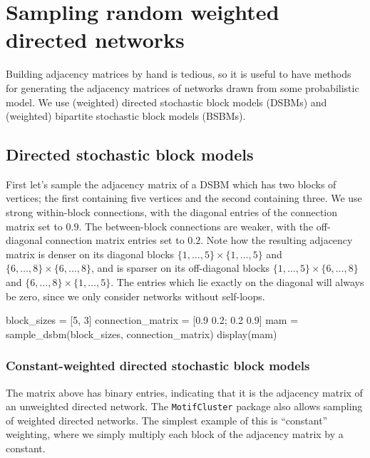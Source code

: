 \documentclass{article}
\begin{document}
\section{Sampling random weighted directed networks}

Building adjacency matrices by hand is tedious,
so it is useful to have methods for generating
the adjacency matrices of networks drawn from some probabilistic model.
We use (weighted) directed stochastic block models (DSBMs) and
(weighted) bipartite stochastic block models (BSBMs).

\subsection{Directed stochastic block models}

First let's sample the adjacency matrix of a DSBM
which has two blocks of vertices;
the first containing five vertices and the second containing three.
We use strong within-block connections,
with the diagonal entries of the connection matrix set to $0.9$.
The between-block connections are weaker, with the off-diagonal
connection matrix entries set to $0.2$.
Note how the resulting adjacency matrix is denser
on its diagonal blocks
$\{1, \dots, 5\} \times \{1, \dots, 5\}$
and
$\{6, \dots, 8\} \times \{6, \dots, 8\}$,
and is sparser on its off-diagonal blocks
$\{1, \dots, 5\} \times \{6, \dots, 8\}$
and
$\{6, \dots, 8\} \times \{1, \dots, 5\}$.
The entries which lie exactly on the diagonal will
always be zero,
since we only consider networks without self-loops.

\begin{tcolorbox}[colback=black!5!white,colframe=black!15!white]
\begin{juliablock}
block_sizes = [5, 3]
connection_matrix = [0.9 0.2; 0.2 0.9]
mam = sample_dsbm(block_sizes, connection_matrix)
display(mam)
\end{juliablock}
\texttt{\obeylines\printpythontex}
\end{tcolorbox}

\subsubsection{Constant-weighted directed stochastic block models}

The matrix above has binary entries,
indicating that it is the adjacency matrix of an unweighted
directed network.
The \texttt{MotifCluster} package also allows sampling of weighted directed networks.
The simplest example of this is ``constant'' weighting,
where we simply multiply each block of the adjacency matrix by a constant.
\end{document}
